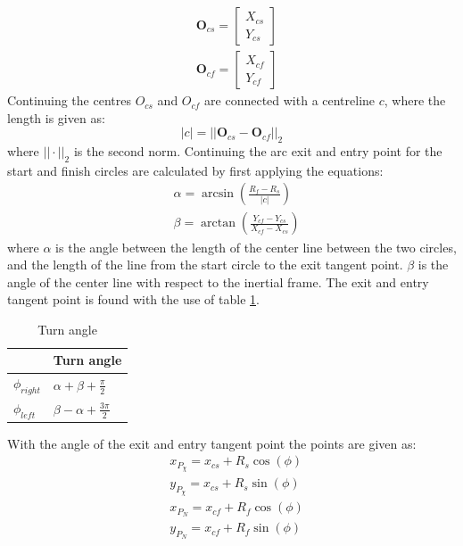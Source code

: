 \begin{align}
& \mathbf{O}_{cs} =
\begin{bmatrix}
X_{cs} \\
Y_{cs}
\end{bmatrix} \\
& \mathbf{O}_{cf} =
\begin{bmatrix}
X_{cf} \\
Y_{cf}
\end{bmatrix}
\end{align}
Continuing the centres $O_{cs}$ and $O_{cf}$ are connected with a centreline $c$, where the length is given as:
\begin{equation}
|c| = ||\mathbf{O}_{cs} - \mathbf{O}_{cf}||_2
\end{equation}
where $||\cdot||_2$ is the second norm. Continuing the arc exit and entry point for the start and finish circles are calculated by first applying the equations:
\begin{subequations}
\begin{align}
& \alpha = \arcsin\left(\frac{R_f-R_s}{|c|}\right) \\
& \beta = \arctan\left(\frac{Y_{cf}-Y_{cs}}{X_{cf}-X_{cs}}\right)
\end{align}
\end{subequations}
where $\alpha$ is the angle between the length of the center line between the two circles, and the length of the line from the start circle to the exit tangent point. $\beta$ is the angle of the center line with respect to the inertial frame. The exit and entry tangent point is found with the use of table \ref{Tb:ExitEntryTangent}.
\begin{table}[H]
\begin{center}
\begin{tabular}{ | l | l |}
\hline
& \textbf{Turn angle} \\ \hline
$\phi_{right}$ & $\alpha + \beta + \frac{\pi}{2}$ \\
$\phi_{left}$ & $\beta - \alpha + \frac{3\pi}{2}$ \\ \hline
\end{tabular}
\caption{Turn angle}
\label{Tb:ExitEntryTangent}
\end{center}

\end{table}
With the angle of the exit and entry tangent point the points are given as:
\begin{subequations}
\begin{align}
& x_{P_\chi} = x_{cs} + R_s\cos(\phi) \\
& y_{P_\chi} = x_{cs} + R_s\sin(\phi) \\
& x_{P_N} = x_{cf} + R_f\cos(\phi) \\
& y_{P_N} = x_{cf} + R_f\sin(\phi)
\end{align}
\end{subequations}
